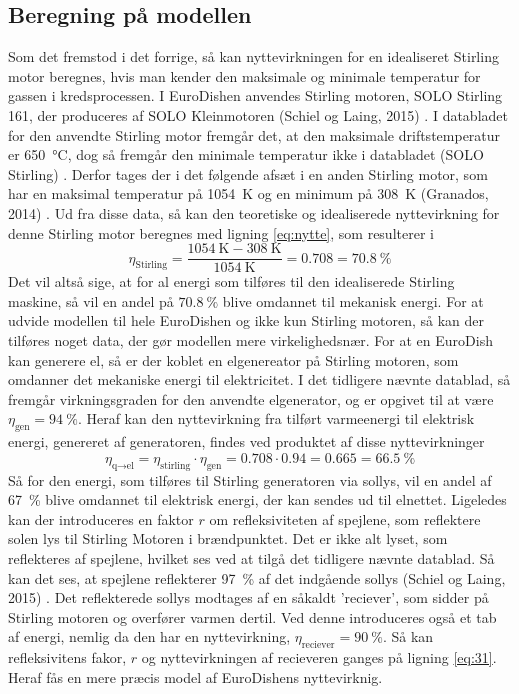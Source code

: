 \documentclass[SRC.tex]{subfiles}
\begin{document}
	\subsection{Beregning på modellen}
	Som det fremstod i det forrige, så kan nyttevirkningen for en idealiseret Stirling motor beregnes, hvis man kender den maksimale og minimale temperatur for gassen i kredsprocessen. I EuroDishen anvendes Stirling motoren, SOLO Stirling 161, der produceres af SOLO Kleinmotoren (Schiel og Laing, 2015) . I databladet for den anvendte Stirling motor fremgår det, at den maksimale driftstemperatur er \SI{650}{\celsius}, dog så fremgår den minimale temperatur ikke i databladet (SOLO Stirling) . Derfor tages der i det følgende afsæt i en anden Stirling motor, som har en maksimal temperatur på \SI{1054}{\kelvin} og en minimum på \SI{308}{\kelvin} (Granados, 2014) . 
	Ud fra disse data, så kan den teoretiske og idealiserede nyttevirkning for denne Stirling motor beregnes med ligning \eqref{eq:nytte}, som resulterer i
	\begin{equation}
		\eta_{\text{Stirling}} = \frac{\SI{1054}{\kelvin} - \SI{308}{\kelvin}}{\SI{1054}{\kelvin}} = 0.708 = \SI{70.8}{\percent}
	\end{equation}
	Det vil altså sige, at for al energi som tilføres til den idealiserede Stirling maskine, så vil en andel på \(\SI{70.8}{\percent}\) blive omdannet til mekanisk energi. For at udvide modellen til hele EuroDishen og ikke kun Stirling motoren, så kan der tilføres noget data, der gør modellen mere virkelighedsnær. For at en EuroDish kan generere el, så er der koblet en elgenereator på Stirling motoren, som omdanner det mekaniske energi til elektricitet. I det tidligere nævnte datablad, så fremgår virkningsgraden for den anvendte elgenerator, og er opgivet til at være \(\eta_{\text{gen}} = \SI{94}{\percent}\). Heraf kan den nyttevirkning fra tilført varmeenergi til elektrisk energi, genereret af generatoren, findes ved produktet af disse nyttevirkninger
	\begin{equation}
		\eta_{\text{q}\rightarrow\text{el}} =  \eta_{\text{stirling}} \cdot \eta_{\text{gen}} = 0.708 \cdot 0.94 = 0.665 = \SI{66.5}{\percent}
		\label{eq:31}
	\end{equation}
	Så for den energi, som tilføres til Stirling generatoren via sollys, vil en andel af \SI{67}{\percent} blive omdannet til elektrisk energi, der kan sendes ud til elnettet. Ligeledes kan der introduceres en faktor \(r\) om refleksiviteten af spejlene, som reflektere solen lys til Stirling Motoren i brændpunktet. Det er ikke alt lyset, som reflekteres af spejlene, hvilket ses ved at tilgå det tidligere nævnte datablad. Så kan det ses, at spejlene reflekterer \SI{97}{\percent} af det indgående sollys (Schiel og Laing, 2015) . Det reflekterede sollys modtages af en såkaldt 'reciever', som sidder på Stirling motoren og overfører varmen dertil. Ved denne introduceres også et tab af energi, nemlig da den har en nyttevirkning, \(\eta_{\text{reciever}} = \SI{90}{\percent}\). Så kan refleksivitens fakor, \(r\) og nyttevirkningen af recieveren ganges på ligning \eqref{eq:31}. Heraf fås en mere præcis model af EuroDishens nyttevirknig.
\end{document}
